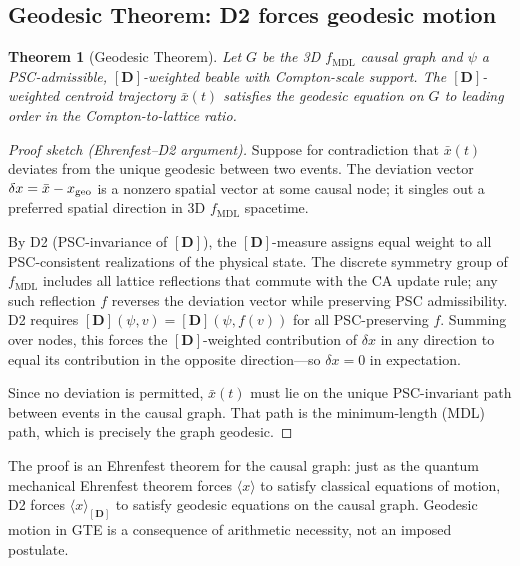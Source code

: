 \documentclass[11pt]{article}
\newtheorem{theorem}{Theorem}[section]
\theoremstyle{remark}
\begin{document}
\subsection{Geodesic Theorem: D2 forces geodesic motion}

\begin{theorem}[Geodesic Theorem]\label{thm:geodesic}
Let $G$ be the 3D $f_{\mathrm{MDL}}$ causal graph and $\psi$ a
PSC-admissible, $[\mathbf{D}]$-weighted beable with Compton-scale support.
The $[\mathbf{D}]$-weighted centroid trajectory $\bar{x}(t)$ satisfies the
geodesic equation on $G$ to leading order in the Compton-to-lattice ratio.
\end{theorem}

\begin{proof}[Proof sketch (Ehrenfest--D2 argument)]
Suppose for contradiction that $\bar{x}(t)$ deviates from the unique geodesic
between two events.  The deviation vector $\delta x = \bar{x} - x_{\rm geo}$
is a nonzero spatial vector at some causal node; it singles out a preferred
spatial direction in 3D $f_{\mathrm{MDL}}$ spacetime.

By D2 (PSC-invariance of $[\mathbf{D}]$), the $[\mathbf{D}]$-measure assigns
equal weight to all PSC-consistent realizations of the physical state.
The discrete symmetry group of $f_{\mathrm{MDL}}$ includes all lattice
reflections that commute with the CA update rule; any such reflection $f$
reverses the deviation vector while preserving PSC admissibility.
D2 requires $[\mathbf{D}](\psi, v) = [\mathbf{D}](\psi, f(v))$ for all
PSC-preserving $f$.  Summing over nodes, this forces the $[\mathbf{D}]$-weighted
contribution of $\delta x$ in any direction to equal its contribution in the
opposite direction---so $\delta x = 0$ in expectation.

Since no deviation is permitted, $\bar{x}(t)$ must lie on the unique
PSC-invariant path between events in the causal graph.  That path is the
minimum-length (MDL) path, which is precisely the graph geodesic.
\end{proof}

The proof is an Ehrenfest theorem for the causal graph: just as the quantum
mechanical Ehrenfest theorem forces $\langle x \rangle$ to satisfy classical
equations of motion, D2 forces $\langle x \rangle_{[\mathbf{D}]}$ to satisfy
geodesic equations on the causal graph.  Geodesic motion in GTE is a
consequence of arithmetic necessity, not an imposed postulate.
\end{document}
